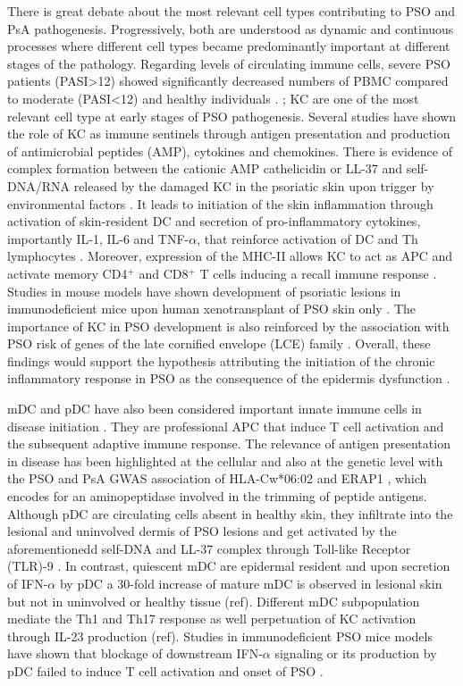 There is great debate about the most relevant cell types contributing to PSO and PsA pathogenesis. Progressively, both are understood as dynamic and continuous processes where different cell types became predominantly important at different stages of the pathology. Regarding levels of circulating immune cells, severe PSO patients (PASI>12) showed significantly decreased numbers of PBMC compared to moderate (PASI<12) and healthy individuals \parencite{Langewouters2008}.
;
KC are one of the most relevant cell type at early stages of PSO pathogenesis. Several studies have shown the role of KC as immune sentinels through antigen presentation and production of antimicrobial peptides (AMP), cytokines and chemokines. There is evidence of complex formation between the cationic AMP cathelicidin or LL-37 and self-DNA/RNA released by the damaged KC in the psoriatic skin upon trigger by environmental factors \parencite{Lande2007}. It leads to initiation of the skin inflammation through activation of skin-resident DC \parencite{Nestle2005} and secretion of pro-inflammatory cytokines, importantly IL-1, IL-6 and TNF-$\alpha$, that reinforce activation of DC and Th lymphocytes \parencite{Feldmeyer2007, Arend2008, Nestle2009}. Moreover, expression of the MHC-II allows KC to act as APC and activate memory CD4$^+$ and CD8$^+$ T cells inducing a recall immune response \parencite{Black2007}. Studies in mouse models have shown development of psoriatic lesions in immunodeficient mice upon human xenotransplant of PSO skin only \parencite{Boyman2004}. The importance of KC in PSO development is also reinforced by the association with PSO risk of genes of the late cornified envelope (LCE) family \parencite{Tsoi2012}. Overall, these findings would support the hypothesis attributing the initiation of the chronic inflammatory response in PSO as the consequence of the epidermis dysfunction . 

mDC and pDC have also been considered important innate immune cells in disease initiation \parencite{Mahil20016}. They are professional APC that induce T cell activation and the subsequent adaptive immune response. The relevance of antigen presentation in disease has been highlighted at the cellular \parencite{Rusell1972, Tiilikainen1980} and also at the genetic level with the PSO and PsA GWAS association of HLA-Cw*06:02 and ERAP1 \parencite{Strange2010}, which encodes for an aminopeptidase involved in the trimming of peptide antigens. Although pDC are circulating cells absent in healthy skin, they infiltrate into the lesional and uninvolved dermis of PSO lesions \parencite{Nestle2005} and get activated by the aforementionedd self-DNA and LL-37 complex through Toll-like Receptor (TLR)-9 \parencite{Lande2007}. In contrast, quiescent mDC are epidermal resident and upon secretion of IFN-$\alpha$ by pDC a 30-fold increase of mature mDC is observed in lesional skin but not in uninvolved or healthy tissue (ref). Different mDC subpopulation mediate the Th1 and Th17 response as well perpetuation of KC activation through IL-23 production (ref). Studies in immunodeficient PSO mice models have shown that blockage of downstream  IFN-$\alpha$ signaling or its production by pDC failed to induce T cell activation and onset of PSO \parencite{Nestle2005}. 

